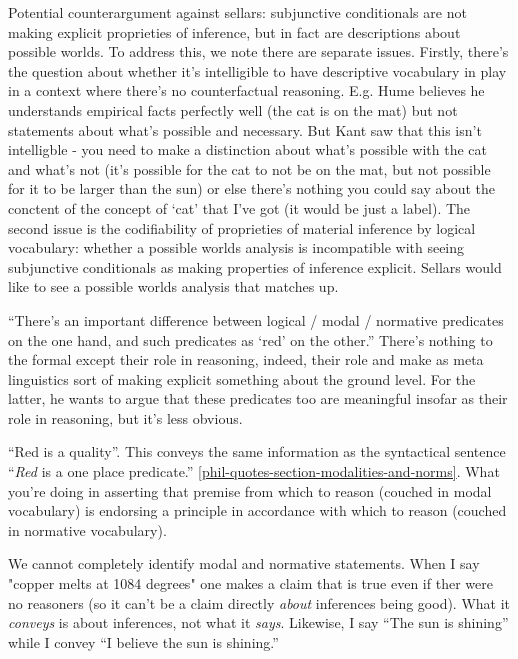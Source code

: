 \documentclass[12pt,a4paper]{report}
\begin{document}
Potential counterargument against sellars: subjunctive conditionals are not making explicit proprieties of inference, but in fact are descriptions about possible worlds. To address this, we note there are separate issues. Firstly, there's the question about whether it's intelligible to have descriptive vocabulary in play in a context where there's no counterfactual reasoning. E.g. Hume believes he understands empirical facts perfectly well (the cat is on the mat) but not statements about what's possible and necessary. But Kant saw that this isn't intelligble - you need to make a distinction about what's possible with the cat and what's not (it's possible for the cat to not be on the mat, but not possible for it to be larger than the sun) or else there's nothing you could say about the conctent of the concept of `cat' that I've got (it would be just a label). The second issue is the codifiability of proprieties of material inference by logical vocabulary: whether a possible worlds analysis is incompatible with seeing subjunctive conditionals as making properties of inference explicit. Sellars would like to see a possible worlds analysis that matches up.

``There's an important difference between logical / modal / normative predicates on the one hand, and such predicates as `red' on the other.'' There's nothing to the formal except their role in reasoning, indeed, their role and make as meta linguistics sort of making explicit something about the ground level. For the latter, he wants to argue that these predicates too are meaningful insofar as their role in reasoning, but it's less obvious.

``Red is a quality''. This conveys the same information as the syntactical sentence ``\textit{Red} is a one place predicate.'' \ref{phil-quotes-section-modalities-and-norms}. What you're doing in asserting that premise from which to reason (couched in modal vocabulary) is endorsing a principle in accordance with which to reason (couched in normative vocabulary).

We cannot completely identify modal and normative statements. When I say "copper melts at 1084 degrees" one makes a claim that is true even if ther were no reasoners (so it can't be a claim directly \emph{about} inferences being good). What it \emph{conveys} is about inferences, not what it \emph{says}. Likewise, I say ``The sun is shining'' while I convey ``I believe the sun is shining.''
\end{document}
